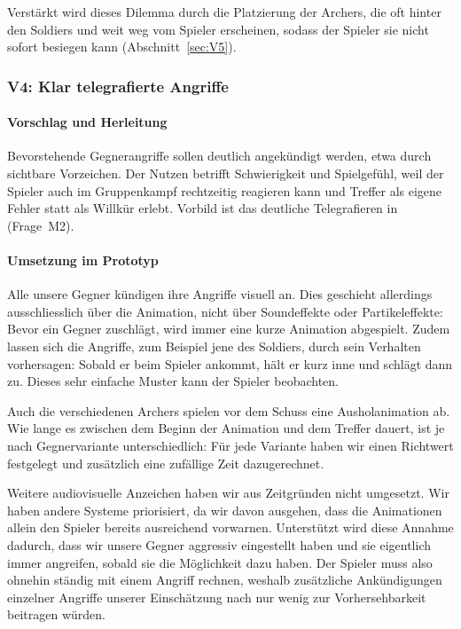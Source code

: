 \documentclass[../Main.tex]{subfiles}
\begin{document}
Verstärkt wird dieses Dilemma durch die Platzierung der Archers, die oft hinter den Soldiers und weit weg vom Spieler erscheinen, sodass der Spieler sie nicht sofort besiegen kann (Abschnitt~\ref{sec:V5}).

\subsubsection{V4: Klar telegrafierte Angriffe} \label{sec:V4}

\paragraph{Vorschlag und Herleitung}
Bevorstehende Gegnerangriffe sollen deutlich angekündigt werden, etwa durch sichtbare Vorzeichen. Der Nutzen betrifft Schwierigkeit und Spielgefühl, weil der Spieler auch im Gruppenkampf rechtzeitig reagieren kann und Treffer als eigene Fehler statt als Willkür erlebt. Vorbild ist das deutliche Telegrafieren in  (Frage~M2).

\paragraph{Umsetzung im Prototyp}
Alle unsere Gegner kündigen ihre Angriffe visuell an. Dies geschieht allerdings ausschliesslich über die Animation, nicht über Soundeffekte oder Partikeleffekte: Bevor ein Gegner zuschlägt, wird immer eine kurze Animation abgespielt. Zudem lassen sich die Angriffe, zum Beispiel jene des Soldiers, durch sein Verhalten vorhersagen: Sobald er beim Spieler ankommt, hält er kurz inne und schlägt dann zu. Dieses sehr einfache Muster kann der Spieler beobachten.

Auch die verschiedenen Archers spielen vor dem Schuss eine Ausholanimation ab. Wie lange es zwischen dem Beginn der Animation und dem Treffer dauert, ist je nach Gegnervariante unterschiedlich: Für jede Variante haben wir einen Richtwert festgelegt und zusätzlich eine zufällige Zeit dazugerechnet.

Weitere audiovisuelle Anzeichen haben wir aus Zeitgründen nicht umgesetzt. Wir haben andere Systeme priorisiert, da wir davon ausgehen, dass die Animationen allein den Spieler bereits ausreichend vorwarnen. Unterstützt wird diese Annahme dadurch, dass wir unsere Gegner aggressiv eingestellt haben und sie eigentlich immer angreifen, sobald sie die Möglichkeit dazu haben. Der Spieler muss also ohnehin ständig mit einem Angriff rechnen, weshalb zusätzliche Ankündigungen einzelner Angriffe unserer Einschätzung nach nur wenig zur Vorhersehbarkeit beitragen würden.
\end{document}
